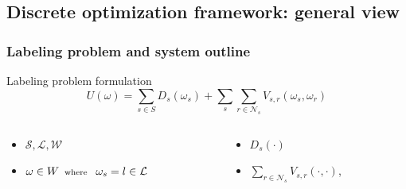 \subsection{Discrete optimization framework: general view}
\begin{frame}\frametitle{Labeling problem and system outline}
\vspace{-5pt}
\begin{footnotesize}
\begin{small}
\begin{block}{Labeling problem formulation}
\begin{equation*}
U(\omega) = \sum_{s\in S} D_s(\omega_s) + \sum_{s}\sum_{r \in \mathcal{N}_{s}} V_{s,r}(\omega_s,\omega_r)
\end{equation*} 
\end{block}
\end{small}
\vspace{-5pt}
\begin{columns}
\begin{column}{.48\textwidth}
\begin{itemize}
\item $\mathcal{S},\mathcal{L}, \mathcal{W}$
\item $\omega \in W \text{\, {\scriptsize where } \,} \omega_s = l \in \mathcal{L}$
\end{itemize}
\end{column}
\begin{column}{.48\textwidth}
\begin{itemize}
\item $D_s(\cdot)$
\item $\sum_{r \in \mathcal{N}_{s}} V_{s,r}(\cdot,\cdot)$,
\end{itemize}
\end{column}
\end{columns}
\end{footnotesize}
\begin{figure}[htbp]
\centering
\begin{scriptsize}
%

\end{scriptsize}
\end{figure}
\end{frame}
